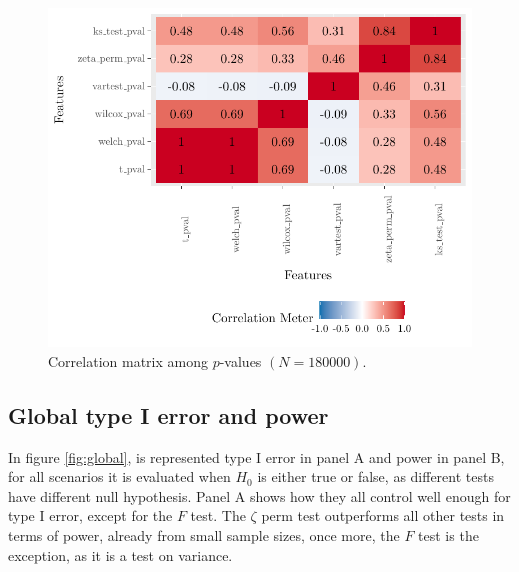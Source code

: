 \documentclass[10pt]{article}\usepackage[]{graphicx}\usepackage[]{xcolor}
\makeatletter
\def\maxwidth{ %
  \ifdim\Gin@nat@width>\linewidth
    \linewidth
  \else
    \Gin@nat@width
  \fi
}
\newenvironment{knitrout}{}{} %
\makeatother
\begin{document}
\begin{knitrout}
\color{fgcolor}\begin{figure}[!h]

{\centering \includegraphics[width=\maxwidth]{figure/correlazioni-1} 

}

\caption[Correlation matrix among $p$-values $(N = 180000)$]{Correlation matrix among $p$-values $(N = 180000)$.}\label{fig:correlazioni}
\end{figure}

\end{knitrout}

\subsection{Global type I error and power}





In figure \ref{fig:global}, is represented type I error in panel A and power in panel B, for all scenarios it is evaluated when $H_0$ is either true or false, as different tests have different null hypothesis. Panel A shows how they all control well enough for type I error, except for the $F$ test. The $\zeta$ perm test outperforms all other tests in terms of power, already from small sample sizes, once more, the $F$ test is the exception, as it is a test on variance.
\end{document}
